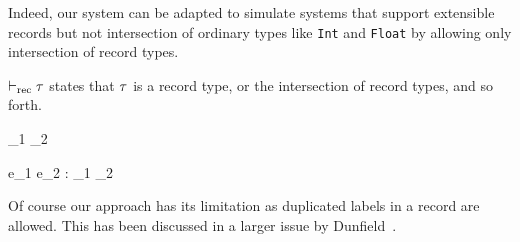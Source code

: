 

Indeed, our system can be adapted to simulate systems that support extensible
records but not intersection of ordinary types like \texttt{Int} and
\texttt{Float} by allowing only intersection of record types.

$ \vdash_{\textrm{rec}} \tau $ states that $ \tau $ is a record type, or the intersection of
record types, and so forth.


{\turnsrec \ty_1 \intersects \ty_2}

{\Gamma \turns e_1 \dcomma e_2 : \ty_1 \intersects \ty_2 }

Of course our approach has its limitation as duplicated labels in a record are
allowed. This has been discussed in a larger issue by
Dunfield~\cite{dunfield2014elaborating}.

